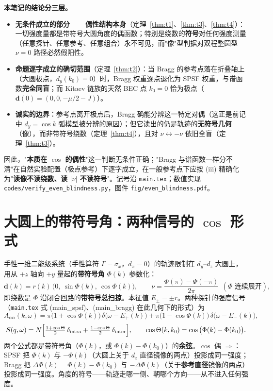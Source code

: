 \documentclass[onecolumn,aps,prl,superscriptaddress,longbibliography]{revtex4-2}
\begin{document}
\textbf{本笔记的结论分三层。}
\begin{itemize}
\item[(i)] \textbf{无条件成立的部分——偶性结构本身}（定理~\ref{thm:t1}、\ref{thm:t3}、\ref{thm:t4}）：一切强度量都是带符号大圆角度的偶函数；特别是绕数的\textbf{符号}对任何强度测量（任意探针、任意参考、任意组合）永不可见，而"像"型判据对双程整圆型 $\nu=0$ 路径必然假阳性。
\item[(ii)] \textbf{命题逐字成立的确切范围}（定理~\ref{thm:t2}）：当 Bragg 的参考点落在折叠轴上（大圆极点，$d_y(k_0)=0$）时，Bragg 权重逐点退化为 SPSF 权重，与谱函数\textbf{完全同盲}；而 Kitaev 链族的天然 BEC 点 $k_0=0$ 恰为极点（$\mathbf{d}(0)=(0,0,-\mu/2-J)$）。
\item[(iii)] \textbf{诚实的边界}：参考点离开极点后，Bragg 确能分辨这一特定对偶（这正是前记中 $d_y=\cos k$ 弧模型被分辨的原因）；但它读出的仍是轨迹的\textbf{无符号几何}（像），而非带符号绕数（定理~\ref{thm:t4}），且对 $\nu\leftrightarrow-\nu$ 依旧全盲（定理~\ref{thm:t3}）。
\end{itemize}
因此，"\textbf{本质在 $\cos$ 的偶性}"这一判断无条件正确；"Bragg 与谱函数一样分不清"在自然实验配置（极点参考）下逐字成立，在一般参考点下应按 (iii) 精确化为"\textbf{读像不读绕数、读 $|\nu|$ 不读符号}"。记号沿 \texttt{main.tex}；数值实现 \texttt{codes/verify\_even\_blindness.py}，图件 \texttt{fig/even\_blindness.pdf}。

\section{大圆上的带符号角：两种信号的 $\cos$ 形式}\label{sec:setup}

手性一维二能级系统（手性算符 $\Gamma=\sigma_x$，$d_x=0$）的轨迹限制在 $d_y$--$d_z$ 大圆上，用从 $+z$ 轴向 $+y$ 量起的\textbf{带符号角} $\Phi(k)$ 参数化：
\begin{equation}\label{eq:circle}
\mathbf{d}(k) = r(k)\,\big(0,\ \sin\Phi(k),\ \cos\Phi(k)\big),\qquad
\nu = \frac{\Phi(\pi)-\Phi(-\pi)}{2\pi}\ \ (\text{$\Phi$ 连续展开}),
\end{equation}
即绕数是 $\Phi$ 沿闭合回路的\textbf{带符号总扫掠}。本征值 $E_\pm=\pm r$。两种探针的强度信号（\texttt{main.tex} 式 (main\_spsf)、(main\_bragg) 在此几何下的形式）为
\begin{equation}\label{eq:spsf-cos}
A_{\alpha\alpha}(k,\omega) = \pi\big(1+\cos\Phi(k)\big)\,\delta\big(\omega-E_+(k)\big)
+ \pi\big(1-\cos\Phi(k)\big)\,\delta\big(\omega-E_-(k)\big),
\end{equation}
\begin{equation}\label{eq:bragg-cos}
S(q,\omega) = N\Big[\tfrac{1+\cos\Theta}{2}\,\delta_{\rm intra}
+ \tfrac{1-\cos\Theta}{2}\,\delta_{\rm inter}\Big],
\qquad \cos\Theta(k,k_0) = \cos\big(\Phi(k)-\Phi(k_0)\big).
\end{equation}
两个公式都是带符号角（$\Phi(k)$，或 $\Phi(k)-\Phi(k_0)$）的\textbf{余弦}。$\cos$ 偶 $\Longrightarrow$：SPSF 把 $\Phi(k)$ 与 $-\Phi(k)$（大圆上关于 $d_z$ 直径镜像的两点）投影成同一强度；Bragg 把 $\Delta\Phi(k)=\Phi(k)-\Phi(k_0)$ 与 $-\Delta\Phi(k)$（关于\textbf{参考直径}镜像的两点）投影成同一强度。角度的符号——轨迹走哪一侧、朝哪个方向——从不进入任何强度。
\end{document}
